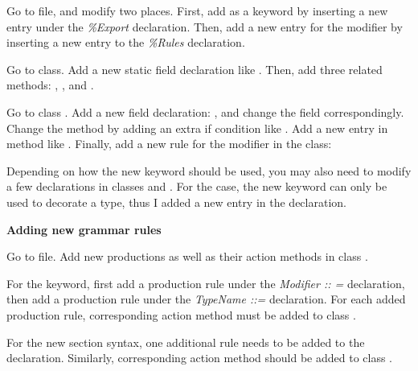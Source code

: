 \documentclass{article}
\begin{document}
\begin{enumerate}

\Item Go to  file, and modify two places. First, add  as a keyword by inserting a new entry under the \textit{\%Export} declaration. Then, add a new entry for the  modifier by inserting a new entry to the \textit{\%Rules} declaration.

\Item Go to  class. Add a new static field declaration like . Then, add three related methods: , , and .  

\Item Go to class . Add a new field declaration: , and change the field  correspondingly.  Change the  method by adding an extra if condition like  .  Add a new entry in method  like  . Finally, add a new rule for the modifier  in the  class:



\Item Depending on how the new keyword should be used, you may also need to modify a few declarations in classes  
and . For the  case, the new keyword can only be used to decorate a type, thus  I added a new entry in the  declaration.

\end{enumerate}

\textbf{Adding new grammar rules}

\begin{enumerate}

\Item Go to  file. Add new productions as well as their action methods in class .

\Item For the  keyword, first add a production rule under the \textit{Modifier :: =} declaration, then add a production rule under the \textit{TypeName ::= } declaration. For each added production rule, corresponding action method must be added to class .

\Item For the new  section syntax, one additional rule needs to be added to the  declaration. Similarly, corresponding action method should be added to class .

\end{enumerate}
\end{document}
